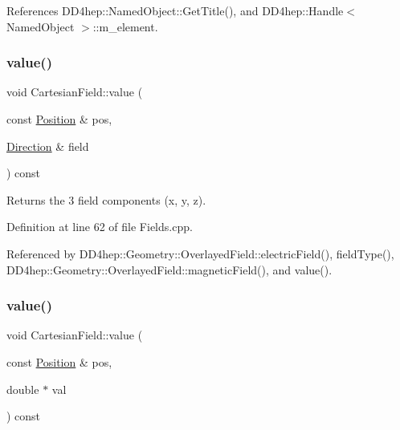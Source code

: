 References D\+D4hep\+::\+Named\+Object\+::\+Get\+Title(), and D\+D4hep\+::\+Handle$<$ Named\+Object $>$\+::m\+\_\+element.

\hypertarget{class_d_d4hep_1_1_geometry_1_1_cartesian_field_aee30aac03bc7bcc38be567438e3f5583}{}\label{class_d_d4hep_1_1_geometry_1_1_cartesian_field_aee30aac03bc7bcc38be567438e3f5583} 
\subsubsection{\texorpdfstring{value()}{value()}\hspace{0.1cm}{\footnotesize\ttfamily [1/3]}}
{\footnotesize\ttfamily void Cartesian\+Field\+::value (\begin{DoxyParamCaption}\item[{const \hyperlink{namespace_d_d4hep_1_1_geometry_a55083902099d03506c6db01b80404900}{Position} \&}]{pos,  }\item[{\hyperlink{namespace_d_d4hep_1_1_geometry_a56730a0ddb9f3f089c415cd693bd7c19}{Direction} \&}]{field }\end{DoxyParamCaption}) const}



Returns the 3 field components (x, y, z). 



Definition at line 62 of file Fields.\+cpp.



Referenced by D\+D4hep\+::\+Geometry\+::\+Overlayed\+Field\+::electric\+Field(), field\+Type(), D\+D4hep\+::\+Geometry\+::\+Overlayed\+Field\+::magnetic\+Field(), and value().

\hypertarget{class_d_d4hep_1_1_geometry_1_1_cartesian_field_ab110d05cdede2b371b9ca28992108c62}{}\label{class_d_d4hep_1_1_geometry_1_1_cartesian_field_ab110d05cdede2b371b9ca28992108c62} 
\subsubsection{\texorpdfstring{value()}{value()}\hspace{0.1cm}{\footnotesize\ttfamily [2/3]}}
{\footnotesize\ttfamily void Cartesian\+Field\+::value (\begin{DoxyParamCaption}\item[{const \hyperlink{namespace_d_d4hep_1_1_geometry_a55083902099d03506c6db01b80404900}{Position} \&}]{pos,  }\item[{double $\ast$}]{val }\end{DoxyParamCaption}) const}



